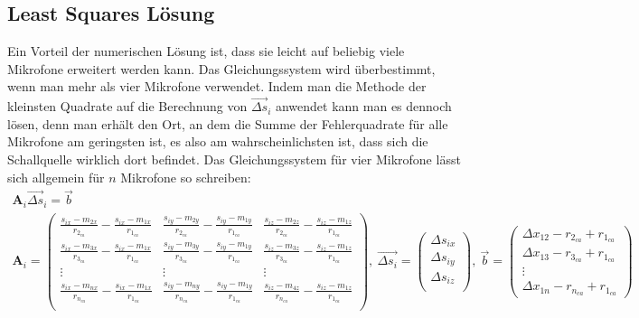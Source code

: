 \subsection{Least Squares Lösung}
Ein Vorteil der numerischen Lösung ist, dass sie leicht auf beliebig viele Mikrofone erweitert werden kann. Das Gleichungssystem wird überbestimmt, wenn man mehr als vier Mikrofone verwendet. Indem man die Methode der kleinsten Quadrate auf die Berechnung von $\vec{\Delta{s}}_i$ anwendet kann man es dennoch lösen, denn man erhält den Ort, an dem die Summe der Fehlerquadrate für alle Mikrofone am geringsten ist, es also am wahrscheinlichsten ist, dass sich die Schallquelle wirklich dort befindet.
Das Gleichungssystem für vier Mikrofone lässt sich allgemein für $n$ Mikrofone so schreiben:
\begin{gather*}
    \mathbf{A}_i\vec{\Delta{s}}_i = \vec{b}\\
    \mathbf{A}_i =
    {\begin{pmatrix}
          \frac{s_{ix} - m_{2x}}{r_{2_{ca}}} - \frac{s_{ix} - m_{1x}}{r_{1_{ca}}} & \frac{s_{iy} - m_{2y}}{r_{2_{ca}}} - \frac{s_{iy} - m_{1y}}{r_{1_{ca}}} & \frac{s_{iz} - m_{2z}}{r_{2_{ca}}} - \frac{s_{iz} - m_{1z}}{r_{1_{ca}}} \\
          \frac{s_{ix} - m_{3x}}{r_{3_{ca}}} - \frac{s_{ix} - m_{1x}}{r_{1_{ca}}} & \frac{s_{iy} - m_{3y}}{r_{3_{ca}}} - \frac{s_{iy} - m_{1y}}{r_{1_{ca}}} & \frac{s_{iz} - m_{3z}}{r_{3_{ca}}} - \frac{s_{iz} - m_{1z}}{r_{1_{ca}}} \\
          \vdots & \vdots & \vdots \\
          \frac{s_{ix} - m_{nx}}{r_{n_{ca}}} - \frac{s_{ix} - m_{1x}}{r_{1_{ca}}} & \frac{s_{iy} - m_{ny}}{r_{n_{ca}}} - \frac{s_{iy} - m_{1y}}{r_{1_{ca}}} & \frac{s_{iz} - m_{4z}}{r_{n_{ca}}} - \frac{s_{iz} - m_{1z}}{r_{1_{ca}}} \\
      \end{pmatrix}},
    ~
    \vec{\Delta{s}_i} =
    \begin{pmatrix}
        {\Delta{s}}_{ix} \\
        {\Delta{s}}_{iy} \\
        {\Delta{s}}_{iz} \\
    \end{pmatrix},
    ~
    \vec{b} =
    \begin{pmatrix}
        \Delta{x_{12}} - r_{2_{ca}} + r_{1_{ca}}\\
        \Delta{x_{13}} - r_{3_{ca}} + r_{1_{ca}}\\
        \vdots \\
        \Delta{x_{1n}} - r_{n_{ca}} + r_{1_{ca}}
    \end{pmatrix}
\end{gather*}
